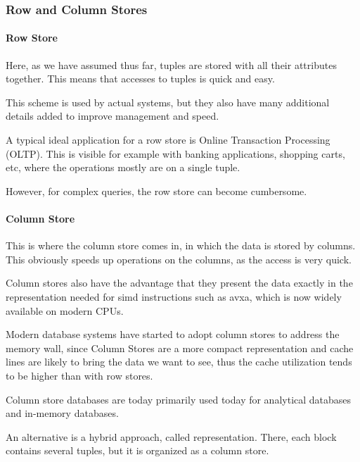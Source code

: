 \subsubsection{Row and Column Stores}
\paragraph{Row Store}
Here, as we have assumed thus far, tuples are stored with all their attributes together.
This means that accesses to tuples is quick and easy.

This scheme is used by actual systems, but they also have many additional details added to improve management and speed.

A typical ideal application for a row store is Online Transaction Processing (OLTP).
This is visible for example with banking applications, shopping carts, etc, where the operations mostly are on a single tuple.

However, for complex queries, the row store can become cumbersome.


\paragraph{Column Store}
This is where the column store comes in, in which the data is stored by columns.
This obviously speeds up operations on the columns, as the access is very quick.

Column stores also have the advantage that they present the data exactly in the representation needed for \acrshort{simd} instructions such as \acrshort{avxa},
which is now widely available on modern CPUs.

Modern database systems have started to adopt column stores to address the memory wall,
since Column Stores are a more compact representation and cache lines are likely to bring the data we want to see,
thus the cache utilization tends to be higher than with row stores.

Column store databases are today primarily used today for analytical databases and in-memory databases.


An alternative is a hybrid approach, called  representation.
There, each block contains several tuples, but it is organized as a column store.

